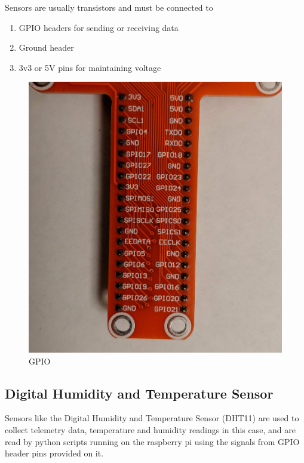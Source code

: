 \documentclass[11pt,openright]{report}
\begin{document}
Sensors are usually transistors and must be connected to
\begin{enumerate}
\item GPIO headers for sending or receiving data
\item  Ground header 
\item  3v3 or 5V pins for maintaining voltage
\end{enumerate}

\begin{figure}
    \centering
    \includegraphics[scale=0.1]{images/gpiopins.jpg}
    \caption{GPIO}
    \label{fig:gpio_pins}
\end{figure}

\subsection{Digital Humidity and Temperature Sensor}
Sensors like the Digital Humidity and Temperature Sensor (DHT11) are used to collect telemetry data, temperature and humidity readings in this case, and are read by python scripts running on the raspberry pi using the signals from GPIO header pins provided on it.
\end{document}
